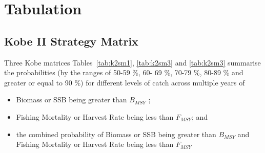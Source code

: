 \documentclass[shortnames,nojss,article]{jss}
\begin{document}
\section{Tabulation}

\subsection{Kobe II Strategy Matrix}

Three Kobe matrices Tables~\ref{tab:k2sm1}, \ref{tab:k2sm3} and \ref{tab:k2sm3} summarise the probabilities (by the ranges 
of 50-59 \%, 60- 69 \%, 70-79 \%, 80-89 \% and greater or equal to 90 \%) for different levels of catch across multiple years of 

\begin{itemize}
 \item  Biomass or SSB being greater than $B_{MSY}$ ;
 \item  Fishing Mortality or Harvest Rate being less than $F_{MSY}$; and 
 \item  the combined probability of Biomass or SSB being greater than $B_{MSY}$ and Fishing Mortality or Harvest Rate being less than $F_{MSY}$ 
\end{itemize}
\end{document}

